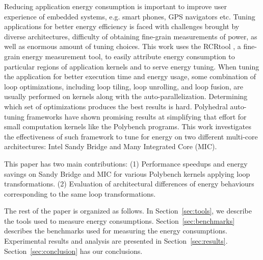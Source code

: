 Reducing application energy consumption is important to improve user experience of 
embedded systems, e.g. smart phones, GPS navigators etc. 
Tuning applications for better energy efficiency is faced with challenges brought by
diverse architectures, difficulty of obtaining fine-grain measurements of power, 
as well as enormous amount of tuning choices.
This work uses the RCRtool \cite{us}, a fine-grain energy measurement tool, to easily attribute energy consumption to particular
regions of application kernels and to serve energy tuning. 
When tuning the application for
better execution time and energy usage, some combination of loop optimizations, including loop 
tiling, loop unrolling, and loop fusion, are usually performed on kernels along with the auto-parallelization.
Determining which set of optimizations produces the best results is hard.
Polyhedral auto-tuning frameworks have shown promising results at simplifying that effort\cite{EJ2012}
for small computation kernels like the Polybench programs. 
This work investigates the effectiveness of such framework to tune for 
energy on two different multi-core architectures: Intel Sandy Bridge
and Many Integrated Core (MIC).
 
This paper has two main contributions: 
(1) Performance speedups and energy savings on Sandy Bridge and MIC for various Polybench kernels applying loop transformations. 
(2) Evaluation of architectural differences of energy behaviours corresponding to the same loop transformations.

The rest of the paper is organized as follows. In Section~\ref{sec:tools}, we describe the tools
used to measure energy consumptions. Section~\ref{sec:benchmarks} describes the benchmarks used for  
measuring the energy consumptions. Experimental results and analysis are presented in Section~\ref{sec:results}. Section~\ref{sec:conclusion} has our conclusions.

